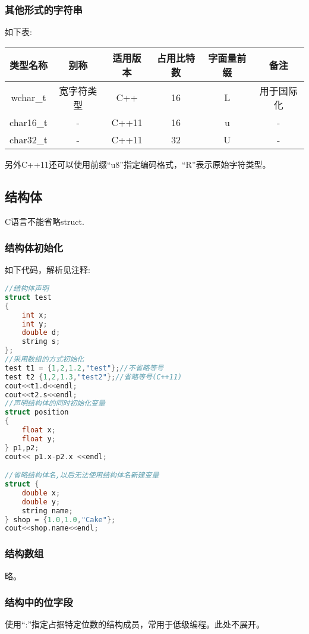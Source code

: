 \documentclass{article}
\begin{document}
    \subsubsection{其他形式的字符串}
    如下表:
    \begin{table}[H]
        \centering
        \begin{tabular}{cccccc}
            \hline
             类型名称 & 别称 &  适用版本 & 占用比特数 & 字面量前缀 & 备注 \\ \hline
             wchar\_t & 宽字符类型 & C++ & 16 & L & 用于国际化 \\
             char16\_t & - & C++11 & 16 & u & - \\
             char32\_t & - & C++11 & 32 & U & - \\ 
             \hline
        \end{tabular}
    \end{table}
    另外C++11还可以使用前缀``u8''指定编码格式，``R''表示原始字符类型。

    \subsection{结构体}
    C语言不能省略struct. 

    \subsubsection{结构体初始化}
    如下代码，解析见注释:
    \begin{lstlisting}[language=c++]
//结构体声明
struct test
{
    int x;
    int y;
    double d;
    string s;
};
//采用数组的方式初始化
test t1 = {1,2,1.2,"test"};//不省略等号
test t2 {1,2,1.3,"test2"};//省略等号(C++11)
cout<<t1.d<<endl;
cout<<t2.s<<endl;
//声明结构体的同时初始化变量
struct position
{
    float x;
    float y;
} p1,p2;
cout<< p1.x-p2.x <<endl;

//省略结构体名,以后无法使用结构体名新建变量
struct {
    double x;
    double y;
    string name;
} shop = {1.0,1.0,"Cake"};
cout<<shop.name<<endl;
    \end{lstlisting}

    \subsubsection{结构数组}
    略。
    \subsubsection{结构中的位字段}
    使用``:''指定占据特定位数的结构成员，常用于低级编程。此处不展开。
\end{document}
